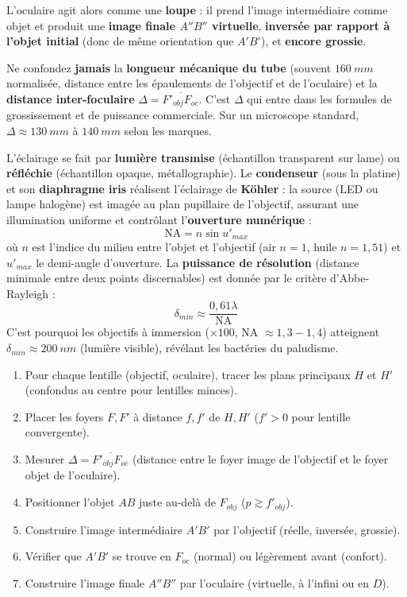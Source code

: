 \documentclass[11pt]{article}
\newcounter{popsec}
\newcounter{popsub}
\newcommand{\courssub}[1]{%
  \stepcounter{popsub}%
  \par\vspace{9pt}\noindent{\popxbold\fontsize{11.5}{13}\selectfont\color{popink}{\color{poporange}\thepopsec.\thepopsub}\hspace{6pt}#1}\par\nopagebreak\vspace{4pt}
}
\begin{document}
L'oculaire agit alors comme une \textbf{loupe} : il prend l'image intermédiaire comme objet et produit une \textbf{image finale $A''B''$ virtuelle}, \textbf{inversée par rapport à l'objet initial} (donc de même orientation que $A'B'$), et \textbf{encore grossie}.

\begin{attention}
Ne confondez \textbf{jamais} la \textbf{longueur mécanique du tube} (souvent $\SI{160}{mm}$ normalisée, distance entre les épaulements de l'objectif et de l'oculaire) et la \textbf{distance inter-foculaire} $\Delta = \overline{F'_{obj}F_{oc}}$. C'est $\Delta$ qui entre dans les formules de grossissement et de puissance commerciale. Sur un microscope standard, $\Delta \approx \SI{130}{mm}$ à $\SI{140}{mm}$ selon les marques.
\end{attention}

\courssub{Éclairage et résolution (aperçu)}

L'éclairage se fait par \textbf{lumière transmise} (échantillon transparent sur lame) ou \textbf{réfléchie} (échantillon opaque, métallographie). Le \textbf{condenseur} (sous la platine) et son \textbf{diaphragme iris} réalisent l'éclairage de \textbf{Köhler} : la source (LED ou lampe halogène) est imagée au plan pupillaire de l'objectif, assurant une illumination uniforme et contrôlant l'\textbf{ouverture numérique} :
\[
\text{NA} = n \sin u'_{max}
\]
où $n$ est l'indice du milieu entre l'objet et l'objectif (air $n=1$, huile $n=1,51$) et $u'_{max}$ le demi-angle d'ouverture. La \textbf{puissance de résolution} (distance minimale entre deux points discernables) est donnée par le critère d'Abbe-Rayleigh :
\[
\delta_{min} \approx \frac{0,61 \lambda}{\text{NA}}
\]
C'est pourquoi les objectifs à immersion ($\times 100$, NA $\approx 1,3-1,4$) atteignent $\delta_{min} \approx \SI{200}{nm}$ (lumière visible), révélant les bactéries du paludisme.

\begin{methode}
\begin{enumerate}
    \item Pour chaque lentille (objectif, oculaire), tracer les plans principaux $H$ et $H'$ (confondus au centre pour lentilles minces).
    \item Placer les foyers $F, F'$ à distance $f, f'$ de $H, H'$ ($f' > 0$ pour lentille convergente).
    \item Mesurer $\Delta = \overline{F'_{obj}F_{oc}}$ (distance entre le foyer image de l'objectif et le foyer objet de l'oculaire).
    \item Positionner l'objet $AB$ juste au-delà de $F_{obj}$ ($p \gtrsim f'_{obj}$).
    \item Construire l'image intermédiaire $A'B'$ par l'objectif (réelle, inversée, grossie).
    \item Vérifier que $A'B'$ se trouve en $F_{oc}$ (normal) ou légèrement avant (confort).
    \item Construire l'image finale $A''B''$ par l'oculaire (virtuelle, à l'infini ou en $D$).
\end{enumerate}
\end{methode}
\end{document}
